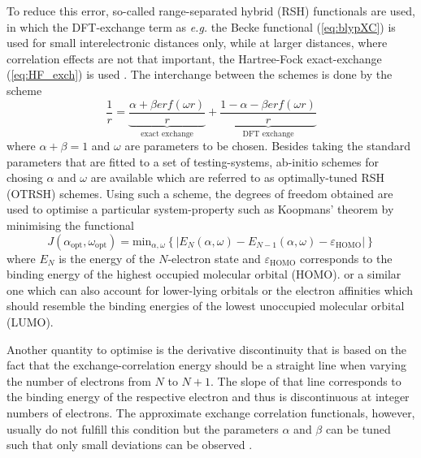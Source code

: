 To reduce this error, so-called range-separated hybrid (RSH) functionals are used, in which the DFT-exchange term as \textit{e.g.} the Becke functional (\ref{eq:blypXC}) is used for small interelectronic distances only, while at larger distances, where correlation effects are not that important, the Hartree-Fock exact-exchange (\ref{eq:HF_exch}) is used \cite{LC-tddft}.
The interchange between the schemes is done by the scheme
\begin{equation}
   \frac 1r = \underbrace{\frac{\alpha +\beta erf(\omega r)}{r}}_{\text{exact exchange}} +\underbrace{\frac{1-\alpha-\beta erf(\omega r)}{r}}_{\text{DFT exchange}}
\end{equation}
where $\alpha+\beta=1$ and $\omega$ are parameters to be chosen.
Besides taking the standard parameters that are fitted to a set of testing-systems, ab-initio schemes for chosing $\alpha$ and $\omega$ are available which are referred to as optimally-tuned RSH (OTRSH) schemes.
Using such a scheme, the degrees of freedom obtained are used to optimise a particular system-property such as Koopmans' theorem by minimising the functional \cite{Bokareva}
\begin{equation}\label{eq:J_ao}
   J(\alpha_\text{opt},\omega_\text{opt})=\text{min}_{\alpha, \omega} \left\{ |E_N(\alpha,\omega)-E_{N-1}(\alpha,\omega)-\varepsilon_\text{HOMO}| \right\}
\end{equation}
where $E_N$ is the energy of the $N$-electron state and $\varepsilon_\text{HOMO}$ corresponds to the binding energy of the highest occupied molecular orbital (HOMO).
or a similar one which can also account for lower-lying orbitals or the electron affinities which should resemble the binding energies of the lowest unoccupied molecular orbital (LUMO).

Another quantity to optimise is the derivative discontinuity \cite{derdis,sanchez,Autschbach} that is based on the fact that the exchange-correlation energy should be a straight line when varying the number of electrons from $N$ to $N+1$.
The slope of that line corresponds to the binding energy of the respective electron and thus is discontinuous at integer numbers of electrons.
The approximate exchange correlation functionals, however, usually do not fulfill this condition but the parameters $\alpha$ and $\beta$ can be tuned such that only small deviations can be observed \cite{Bokareva}.

